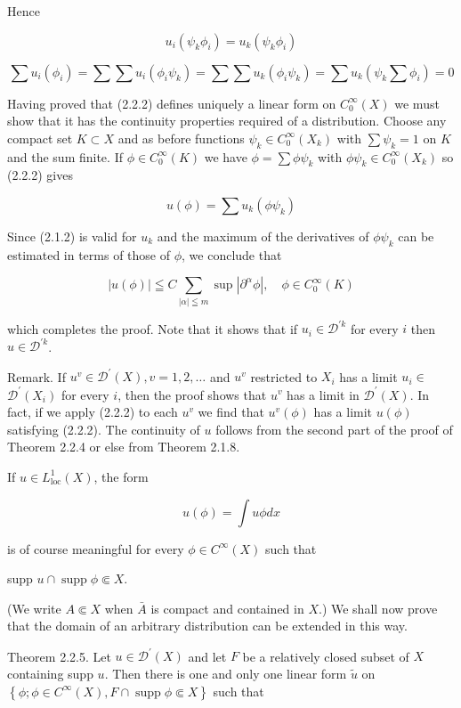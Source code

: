 Hence

\[
u_{i}\left(\psi_{k} \phi_{i}\right)=u_{k}\left(\psi_{k} \phi_{i}\right)
\]

\[
\sum u_{i}\left(\phi_{i}\right)=\sum \sum u_{i}\left(\phi_{i} \psi_{k}\right)=\sum \sum u_{k}\left(\phi_{i} \psi_{k}\right)=\sum u_{k}\left(\psi_{k} \sum \phi_{i}\right)=0
\]

Having proved that (2.2.2) defines uniquely a linear form on $C_{0}^{\infty}(X)$ we must show that it has the continuity properties required of
a distribution. Choose any compact set $K \subset X$ and as before functions $\psi_{k} \in C_{0}^{\infty}\left(X_{k}\right)$ with $\sum \psi_{k}=1$ on $K$ and the sum finite. If $\phi \in C_{0}^{\infty}(K)$ we have $\phi=\sum \phi \psi_{k}$ with $\phi \psi_{k} \in C_{0}^{\infty}\left(X_{k}\right)$ so (2.2.2) gives

\[
u(\phi)=\sum u_{k}\left(\phi \psi_{k}\right)
\]

Since (2.1.2) is valid for $u_{k}$ and the maximum of the derivatives of $\phi \psi_{k}$ can be estimated in terms of those of $\phi$, we conclude that

\[
|u(\phi)| \leqq C \sum_{|\alpha| \leqq m} \sup \left|\partial^{\alpha} \phi\right|, \quad \phi \in C_{0}^{\infty}(K)
\]

which completes the proof. Note that it shows that if $u_{i} \in \mathscr{D}^{\prime k}$ for every $i$ then $u \in \mathscr{D}^{\prime k}$.

Remark. If $u^{v} \in \mathscr{D}^{\prime}(X), v=1,2, \ldots$ and $u^{v}$ restricted to $X_{i}$ has a limit $u_{i} \in$ $\mathscr{D}^{\prime}\left(X_{i}\right)$ for every $i$, then the proof shows that $u^{v}$ has a limit in $\mathscr{D}^{\prime}(X)$. In fact, if we apply (2.2.2) to each $u^{v}$ we find that $u^{v}(\phi)$ has a limit $u(\phi)$ satisfying (2.2.2). The continuity of $u$ follows from the second part of the proof of Theorem 2.2.4 or else from Theorem 2.1.8.

If $u \in L_{\mathrm{loc}}^{1}(X)$, the form

\[
u(\phi)=\int u \phi d x
\]

is of course meaningful for every $\phi \in C^{\infty}(X)$ such that

supp $u \cap \operatorname{supp} \phi \Subset X$.

(We write $A \Subset X$ when $\bar{A}$ is compact and contained in $X$.) We shall now prove that the domain of an arbitrary distribution can be extended in this way.

Theorem 2.2.5. Let $u \in \mathscr{D}^{\prime}(X)$ and let $F$ be a relatively closed subset of $X$ containing supp $u$. Then there is one and only one linear form $\tilde{u}$ on $\left\{\phi ; \phi \in C^{\infty}(X), F \cap \operatorname{supp} \phi \Subset X\right\}$ such that

